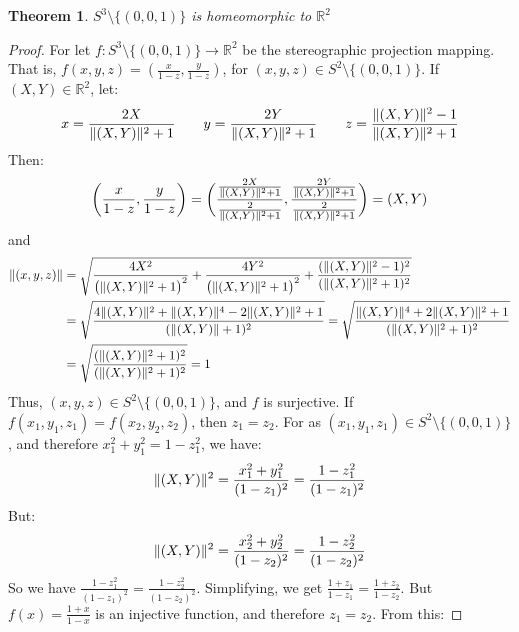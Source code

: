 \documentclass{article}
\theoremstyle{mystyle}
\newtheorem{theorem}{Theorem}[section]
\DeclarePairedDelimiter\norm{\lVert}{\rVert}
\begin{document}
\begin{theorem}
\label{theorem:surgery_theory_the_sphere_with_a_point_removed_is_homeomorphic_to_the_plane}
$S^{3}\setminus \{(0,0,1)\}$ is homeomorphic to $\mathbb{R}^{2}$
\end{theorem}
\begin{proof}
For let $f:S^{3}\setminus \{(0,0,1)\}\rightarrow \mathbb{R}^{2}$ be the stereographic projection mapping. That is, $f(x,y,z) = (\frac{x}{1-z},\frac{y}{1-z})$, for $(x,y,z)\in S^{2}\setminus \{(0,0,1)\}$. If $(X,Y) \in \mathbb{R}^{2}$, let:
\begin{equation*}
     x = \frac{2X}{\norm{(X,Y)}^{2}+1} \quad\quad y = \frac{2Y}{\norm{(X,Y)}^{2}+1}   \quad\quad z = \frac{\norm{(X,Y)}^{2}-1}{\norm{(X,Y)}^{2}+1} 
\end{equation*}
Then:
\begin{equation*}
    \bigg(\frac{x}{1-z},\frac{y}{1-z}\bigg) = \bigg(\frac{\frac{2X}{\norm{(X,Y)}^{2} + 1}}{\frac{2}{\norm{(X,Y)}^{2}+1}},\frac{\frac{2Y}{\norm{(X,Y)}^{2}+1}}{\frac{2}{\norm{(X,Y)}^{2}+1}}\bigg) = (X,Y)    
\end{equation*}
and
\begin{align*}
    \norm{(x,y,z)} &= \sqrt{\frac{4X^{2}}{\big(\norm{(X,Y)}^{2}+1\big)^{2}} + \frac{4Y^{2}}{\big(\norm{(X,Y)}^{2}+1\big)^{2}} + \frac{(\norm{(X,Y)}^{2}-1)^{2}}{(\norm{(X,Y)}^{2}+1)^{2}}}\\
    &= \sqrt{\frac{4\norm{(X,Y)}^{2} + \norm{(X,Y)}^{4} - 2\norm{(X,Y)}^{2} + 1}{(\norm{(X,Y)}+1)^{2}}}= \sqrt{\frac{\norm{(X,Y)}^{4} + 2\norm{(X,Y)}^{2} + 1}{(\norm{(X,Y)}^{2}+1)^{2}}}\\
    &= \sqrt{\frac{(\norm{(X,Y)}^{2}+1)^{2}}{(\norm{(X,Y)}^{2}+1)^{2}}}= 1
\end{align*}
Thus, $(x,y,z) \in S^{2}\setminus \{(0,0,1)\}$, and $f$ is surjective. If $f(x_1,y_1,z_1) = f(x_2,y_2,z_2)$, then $z_{1} = z_{2}$. For as $(x_1,y_1,z_1)\in S^{2}\setminus\{(0,0,1)\}$, and therefore $x_{1}^{2} + y_{1}^{2} = 1-z_{1}^{2}$, we have:
\begin{equation*}
    \norm{(X,Y)}^{2} = \frac{x_{1}^2+y_{1}^2}{(1-z_{1})^{2}} = \frac{1-z_{1}^{2}}{(1-z_{1})^{2}}
\end{equation*}
But:
\begin{equation*}
    \norm{(X,Y)}^{2} = \frac{x_{2}^{2}+y_{2}^{2}}{(1-z_{2})^{2}} = \frac{1-z_{2}^{2}}{(1-z_{2})^{2}}   
\end{equation*}
So we have $\frac{1-z_{1}^{2}}{(1-z_{1})^{2}} = \frac{1-z_{2}^{2}}{(1-z_{2})^{2}}$. Simplifying, we get $\frac{1+z_{1}}{1-z_{1}} = \frac{1+z_{2}}{1-z_{2}}$. But $f(x) = \frac{1+x}{1-x}$ is an injective function, and therefore $z_{1} = z_{2}$. From this:

\end{proof}
\end{document}
